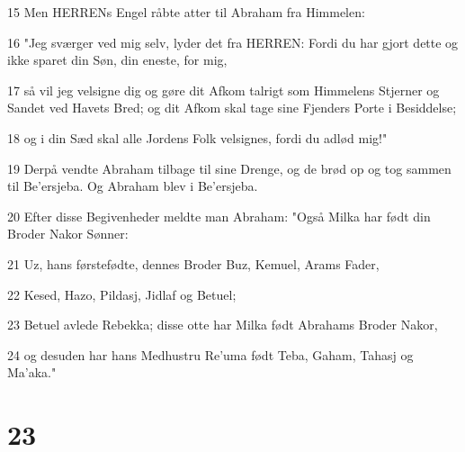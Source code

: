 \par 15 Men HERRENs Engel råbte atter til Abraham fra Himmelen:
\par 16 "Jeg sværger ved mig selv, lyder det fra HERREN: Fordi du har gjort dette og ikke sparet din Søn, din eneste, for mig,
\par 17 så vil jeg velsigne dig og gøre dit Afkom talrigt som Himmelens Stjerner og Sandet ved Havets Bred; og dit Afkom skal tage sine Fjenders Porte i Besiddelse;
\par 18 og i din Sæd skal alle Jordens Folk velsignes, fordi du adlød mig!"
\par 19 Derpå vendte Abraham tilbage til sine Drenge, og de brød op og tog sammen til Be'ersjeba. Og Abraham blev i Be'ersjeba.
\par 20 Efter disse Begivenheder meldte man Abraham: "Også Milka har født din Broder Nakor Sønner:
\par 21 Uz, hans førstefødte, dennes Broder Buz, Kemuel, Arams Fader,
\par 22 Kesed, Hazo, Pildasj, Jidlaf og Betuel;
\par 23 Betuel avlede Rebekka; disse otte har Milka født Abrahams Broder Nakor,
\par 24 og desuden har hans Medhustru Re'uma født Teba, Gaham, Tahasj og Ma'aka."

\chapter{23}

